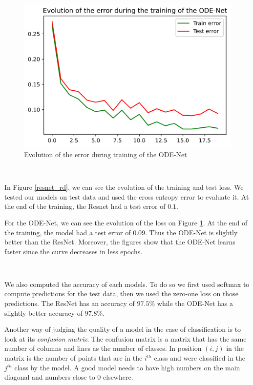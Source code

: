 \documentclass[10pt,a4paper]{article}
\theoremstyle{definition}
\theoremstyle{plain}
\begin{document}
\begin{figure}[!h]
\center
\includegraphics[scale=0.5]{odenet_rd_loss.png}
\caption{Evolution of the error during training of the ODE-Net}
\label{odenet_rd}
\end{figure}

~

In Figure \ref{resnet_rd}, we can see the evolution of the training and test loss. We tested our models on test data and used the cross entropy error to evaluate it. At the end of the training, the Resnet had a test error of $0.1$.

For the ODE-Net, we can see the evolution of the loss on Figure \ref{odenet_rd}. At the end of the training, the model had a test error of $0.09$. Thus the ODE-Net is slightly better than the ResNet. Moreover, the figures show that the ODE-Net learns faster since the curve decreases in less epochs.

~

We also computed the accuracy of each models. To do so we first used softmax to compute predictions for the test data, then we used the zero-one loss on those predictions. The ResNet has an accuracy of $97.5\%$ while the ODE-Net has a slightly better accuracy of $97.8\%$.

Another way of judging the quality of a model in the case of classification is to look at its \textit{confusion matrix}. The confusion matrix is a matrix that has the same number of columns and lines as the number of classes. In position $(i,j)$ in the matrix is the number of points that are in the $i^{th}$ class and were classified in the $j^{th}$ class by the model. A good model needs to have high numbers on the main diagonal and numbers close to $0$ elsewhere.
\end{document}
